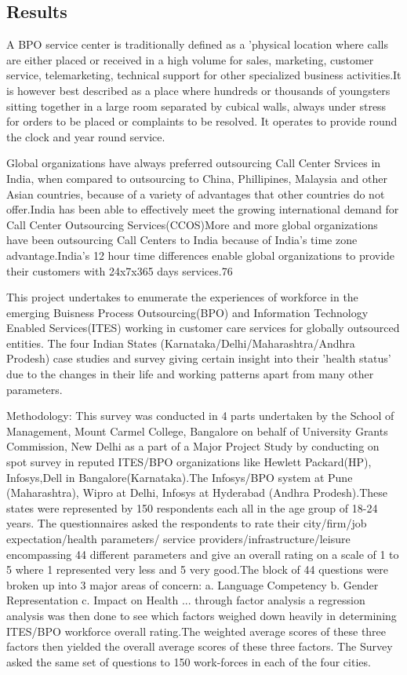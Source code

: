 \subsection{Results}

A BPO service center is traditionally defined as a 'physical location where calls are either placed or received in a high volume for sales, marketing, customer service, telemarketing, technical support for other specialized business activities.It is however best described as a place where hundreds or thousands of youngsters sitting together in a large room separated by cubical walls, always under stress for orders to be placed or complaints to be resolved. It operates to provide round the clock and year round service.

Global organizations have always preferred outsourcing Call Center Srvices in India, when compared to outsourcing to China, Phillipines, Malaysia and other Asian countries, because of a variety of advantages that other countries do not offer.India has been able to effectively meet the growing international demand for Call Center Outsourcing Services(CCOS)More and more global organizations have been outsourcing Call Centers to India because of India's time zone advantage.India's 12 hour time differences enable global organizations to provide their customers with 24x7x365 days services.76%

This project undertakes to enumerate the experiences of workforce in the emerging Buisness Process Outsourcing(BPO) and Information Technology Enabled Services(ITES) working in customer care services for globally outsourced entities. The four Indian States (Karnataka/Delhi/Maharashtra/Andhra Prodesh) case studies and survey giving certain insight into their 'health status' due to the changes in their life and working patterns apart from many other parameters.

Methodology:
This survey was conducted in 4 parts undertaken by the School of Management, Mount Carmel College, Bangalore on behalf of University Grants Commission, New Delhi as a part of a Major  Project Study by conducting on spot survey in reputed ITES/BPO organizations like Hewlett Packard(HP), Infosys,Dell in Bangalore(Karnataka).The Infosys/BPO system at Pune (Maharashtra), Wipro at Delhi, Infosys at Hyderabad (Andhra Prodesh).These states were represented by 150 respondents each all in the age group of 18-24 years. The questionnaires asked the respondents to rate their city/firm/job expectation/health parameters/ service providers/infrastructure/leisure encompassing 44 different parameters and give an overall rating on a scale of 1 to 5 where 1 represented very less and 5 very good.The block of 44 questions were broken up into 3 major areas of concern:
a. Language Competency
b. Gender Representation
c. Impact on Health
... through factor analysis a regression analysis was then done to see which factors weighed down heavily in determining ITES/BPO workforce overall rating.The weighted average scores of these three factors then yielded the overall average scores of these three factors. The Survey asked the same set of questions to 150 work-forces in each of the four cities.

